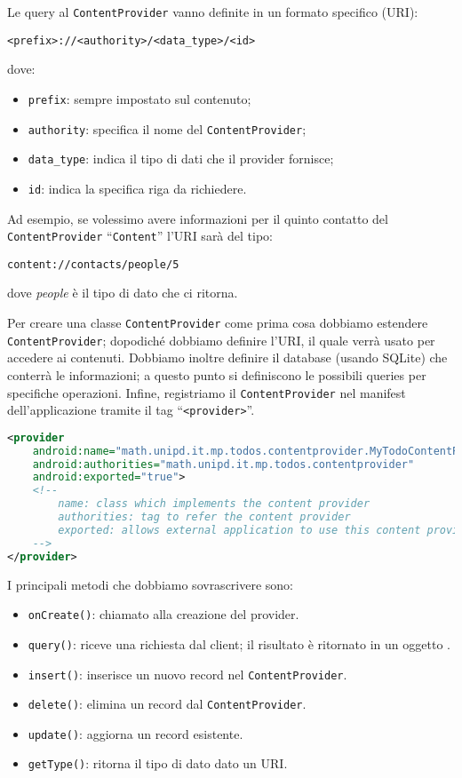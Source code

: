 Le query al \texttt{ContentProvider} vanno definite in un formato
specifico (URI):

\begin{center}
	\texttt{<prefix>://<authority>/<data\_type>/<id>}
\end{center}

dove:
\begin{itemize}
    \item \texttt{prefix}: sempre impostato sul contenuto;
    \item \texttt{authority}: specifica il nome del \texttt{ContentProvider};
    \item \texttt{data\_type}: indica il tipo di dati che il provider fornisce;
    \item \texttt{id}: indica la specifica riga da richiedere.
\end{itemize}

Ad esempio, se volessimo avere informazioni per il quinto contatto del \texttt{ContentProvider} ``\texttt{Content}'' l'URI sarà del tipo:

\begin{center}
	\texttt{content://contacts/people/5}
\end{center}

\noindent dove \textit{people} è il tipo di dato che ci ritorna.

Per creare una classe \texttt{ContentProvider} come prima cosa dobbiamo estendere
\texttt{ContentProvider}; dopodiché dobbiamo definire l'URI, il quale verrà
usato per accedere ai contenuti. Dobbiamo inoltre definire il database (usando
SQLite) che conterrà le informazioni; a questo punto si definiscono le
possibili queries per specifiche operazioni. Infine, registriamo il \texttt{ContentProvider} nel manifest dell'applicazione tramite il tag ``\texttt{<provider>}''.

\begin{lstlisting}[language=XML]
<provider
	android:name="math.unipd.it.mp.todos.contentprovider.MyTodoContentProvider"
	android:authorities="math.unipd.it.mp.todos.contentprovider"
	android:exported="true">
	<!--
		name: class which implements the content provider
		authorities: tag to refer the content provider
		exported: allows external application to use this content provider
	-->
</provider>
\end{lstlisting}

I principali metodi che dobbiamo sovrascrivere sono:
\begin{itemize}
    \item \texttt{onCreate()}: chiamato alla creazione del provider.
    \item \texttt{query()}: riceve una richiesta dal client; il risultato è ritornato in
un oggetto \Cursor.
    \item \texttt{insert()}: inserisce un nuovo record nel \texttt{ContentProvider}.
    \item \texttt{delete()}: elimina un record dal \texttt{ContentProvider}.
    \item \texttt{update()}: aggiorna un record esistente.
    \item \texttt{getType()}: ritorna il tipo di dato dato un URI.
\end{itemize}
% 



